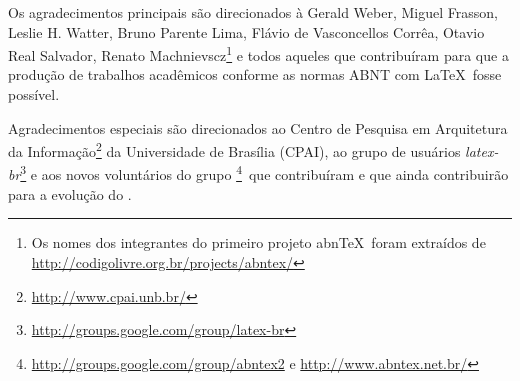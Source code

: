 \documentclass[
	12pt,				%
	openright,			%
	oneside,
	a4paper,			%
	english,			%
	french,				%
	spanish,			%
	brazil				%
	]{abntex2}
\begin{document}
\begin{agradecimentos}
Os agradecimentos principais são direcionados à Gerald Weber, Miguel Frasson,
Leslie H. Watter, Bruno Parente Lima, Flávio de Vasconcellos Corrêa, Otavio Real
Salvador, Renato Machnievscz\footnote{Os nomes dos integrantes do primeiro
projeto abn\TeX\ foram extraídos de
\url{http://codigolivre.org.br/projects/abntex/}} e todos aqueles que
contribuíram para que a produção de trabalhos acadêmicos conforme
as normas ABNT com \LaTeX\ fosse possível.

Agradecimentos especiais são direcionados ao Centro de Pesquisa em Arquitetura
da Informação\footnote{\url{http://www.cpai.unb.br/}} da Universidade de
Brasília (CPAI), ao grupo de usuários
\emph{latex-br}\footnote{\url{http://groups.google.com/group/latex-br}} e aos
novos voluntários do grupo
\emph{\abnTeX}\footnote{\url{http://groups.google.com/group/abntex2} e
\url{http://www.abntex.net.br/}}~que contribuíram e que ainda
contribuirão para a evolução do \abnTeX.

\end{agradecimentos}





 
\end{document}
